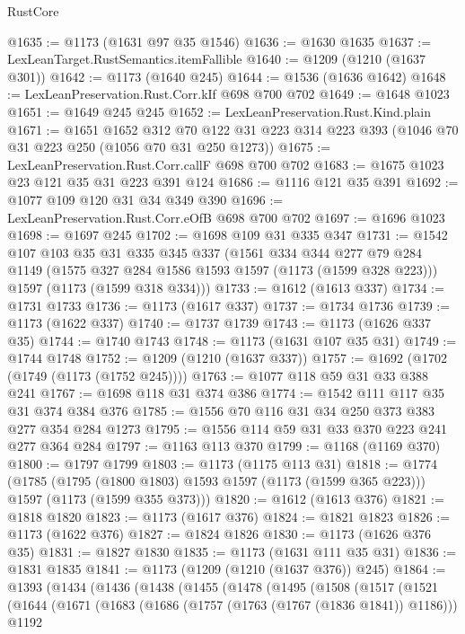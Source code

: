 \begin{lexlean}{RustCore}
\begin{coremodule}
@1635 := @1173 (@1631 @97 @35 @1546)
@1636 := @1630 @1635
@1637 := LexLeanTarget.RustSemantics.itemFallible
@1640 := @1209 (@1210 (@1637 @301))
@1642 := @1173 (@1640 @245)
@1644 := @1536 (@1636 @1642)
@1648 := LexLeanPreservation.Rust.Corr.kIf @698 @700 @702
@1649 := @1648 @1023
@1651 := @1649 @245 @245
@1652 := LexLeanPreservation.Rust.Kind.plain
@1671 := @1651
    @1652
    @312
    @70
    @122
    @31
    @223
    @314
    @223
    @393
    (@1046 @70 @31 @223 @250 (@1056 @70 @31 @250 @1273))
@1675 := LexLeanPreservation.Rust.Corr.callF @698 @700 @702
@1683 := @1675 @1023 @23 @121 @35 @31 @223 @391 @124
@1686 := @1116 @121 @35 @391
@1692 := @1077 @109 @120 @31 @34 @349 @390
@1696 := LexLeanPreservation.Rust.Corr.eOfB @698 @700 @702
@1697 := @1696 @1023
@1698 := @1697 @245
@1702 := @1698 @109 @31 @335 @347
@1731 := @1542
    @107
    @103
    @35
    @31
    @335
    @345
    @337
    (@1561
      @334
      @344
      @277
      @79
      @284
      @1149
      (@1575 @327 @284 @1586 @1593 @1597 (@1173 (@1599 @328 @223)))
      @1597
      (@1173 (@1599 @318 @334)))
@1733 := @1612 (@1613 @337)
@1734 := @1731 @1733
@1736 := @1173 (@1617 @337)
@1737 := @1734 @1736
@1739 := @1173 (@1622 @337)
@1740 := @1737 @1739
@1743 := @1173 (@1626 @337 @35)
@1744 := @1740 @1743
@1748 := @1173 (@1631 @107 @35 @31)
@1749 := @1744 @1748
@1752 := @1209 (@1210 (@1637 @337))
@1757 := @1692 (@1702 (@1749 (@1173 (@1752 @245))))
@1763 := @1077 @118 @59 @31 @33 @388 @241
@1767 := @1698 @118 @31 @374 @386
@1774 := @1542 @111 @117 @35 @31 @374 @384 @376
@1785 := @1556 @70 @116 @31 @34 @250 @373 @383 @277 @354 @284 @1273
@1795 := @1556 @114 @59 @31 @33 @370 @223 @241 @277 @364 @284
@1797 := @1163 @113 @370
@1799 := @1168 (@1169 @370)
@1800 := @1797 @1799
@1803 := @1173 (@1175 @113 @31)
@1818 := @1774
    (@1785
      (@1795 (@1800 @1803) @1593 @1597 (@1173 (@1599 @365 @223)))
      @1597
      (@1173 (@1599 @355 @373)))
@1820 := @1612 (@1613 @376)
@1821 := @1818 @1820
@1823 := @1173 (@1617 @376)
@1824 := @1821 @1823
@1826 := @1173 (@1622 @376)
@1827 := @1824 @1826
@1830 := @1173 (@1626 @376 @35)
@1831 := @1827 @1830
@1835 := @1173 (@1631 @111 @35 @31)
@1836 := @1831 @1835
@1841 := @1173 (@1209 (@1210 (@1637 @376)) @245)
@1864 := @1393
    (@1434
      (@1436
        (@1438
          (@1455
            (@1478
              (@1495
                (@1508
                  (@1517
                    (@1521
                      (@1644
                        (@1671
                          (@1683
                            (@1686 (@1757 (@1763 (@1767 (@1836 @1841)) @1186)))
                            @1192

\end{coremodule}
\end{lexlean}
